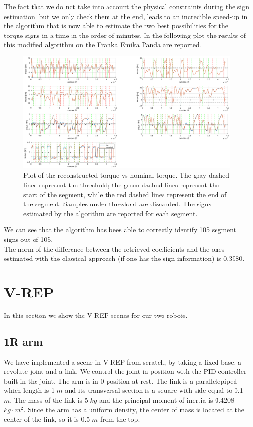 \documentclass{article}
\begin{document}
The fact that we do not take into account the physical constraints during the sign estimation, but we only check them at the end, leads to an incredible speed-up in the algorithm that is now able to estimate the two best possibilities for the torque signs in a time in the order of minutes.
In the following plot the results of this modified algorithm on the Franka Emika Panda are reported.
\FloatBarrier
\begin{figure}
\centering
\includegraphics[width=1\textwidth]{images/franka_result.eps}
\caption{Plot of the reconstructed torque vs nominal torque. The gray dashed lines represent the threshold; the green dashed lines represent the start of the segment, while the red dashed lines represent the end of the segment. Samples under threshold are discarded. The signs estimated by the algorithm are reported for each segment.}
\end{figure}
\FloatBarrier

We can see that the algorithm has bees able to correctly identify 105 segment signs out of 105.\\
The norm of the difference between the retrieved coefficients and the ones estimated with the classical approach (if one has the sign information) is 0.3980.

\section{V-REP}
In this section we show the V-REP scenes for our two robots.

\subsection{1R arm}We have implemented a scene in V-REP from scratch, by taking a fixed base, a revolute joint and a link. We control the joint in position with the PID controller built in the joint. The arm is in 0 position at rest. The link is a parallelepiped which length is 1 $m$ and its transversal section is a square with side equal to 0.1 $m$. The mass of the link is 5 $kg$ and the principal moment of inertia is 0.4208 $kg\cdot m^2$. Since the arm has a uniform density, the center of mass is located at the center of the link, so it is 0.5 $m$ from the top.
\end{document}
